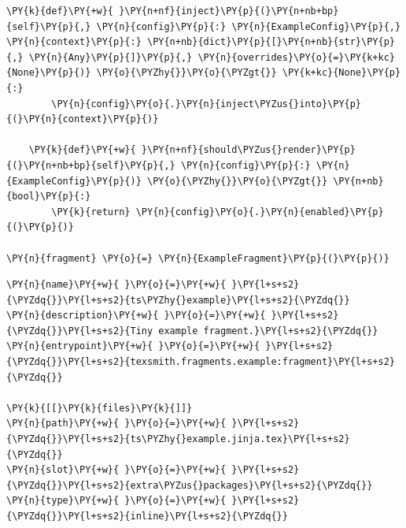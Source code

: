 \documentclass[a4paper,twoside]{article}
\begin{document}
\begin{tscode}[lang=python, engine=pygments]
\begin{Verbatim}[commandchars=\\\{\},breaklines, breakanywhere, commandchars=\\\{\}]
    \PY{k}{def}\PY{+w}{ }\PY{n+nf}{inject}\PY{p}{(}\PY{n+nb+bp}{self}\PY{p}{,} \PY{n}{config}\PY{p}{:} \PY{n}{ExampleConfig}\PY{p}{,} \PY{n}{context}\PY{p}{:} \PY{n+nb}{dict}\PY{p}{[}\PY{n+nb}{str}\PY{p}{,} \PY{n}{Any}\PY{p}{]}\PY{p}{,} \PY{n}{overrides}\PY{o}{=}\PY{k+kc}{None}\PY{p}{)} \PY{o}{\PYZhy{}}\PY{o}{\PYZgt{}} \PY{k+kc}{None}\PY{p}{:}
        \PY{n}{config}\PY{o}{.}\PY{n}{inject\PYZus{}into}\PY{p}{(}\PY{n}{context}\PY{p}{)}

    \PY{k}{def}\PY{+w}{ }\PY{n+nf}{should\PYZus{}render}\PY{p}{(}\PY{n+nb+bp}{self}\PY{p}{,} \PY{n}{config}\PY{p}{:} \PY{n}{ExampleConfig}\PY{p}{)} \PY{o}{\PYZhy{}}\PY{o}{\PYZgt{}} \PY{n+nb}{bool}\PY{p}{:}
        \PY{k}{return} \PY{n}{config}\PY{o}{.}\PY{n}{enabled}\PY{p}{(}\PY{p}{)}

\PY{n}{fragment} \PY{o}{=} \PY{n}{ExampleFragment}\PY{p}{(}\PY{p}{)}
\end{Verbatim}
\end{tscode}
\begin{tscode}[lang=toml, engine=pygments]
\begin{Verbatim}[commandchars=\\\{\},breaklines, breakanywhere, commandchars=\\\{\}]
\PY{n}{name}\PY{+w}{ }\PY{o}{=}\PY{+w}{ }\PY{l+s+s2}{\PYZdq{}}\PY{l+s+s2}{ts\PYZhy{}example}\PY{l+s+s2}{\PYZdq{}}
\PY{n}{description}\PY{+w}{ }\PY{o}{=}\PY{+w}{ }\PY{l+s+s2}{\PYZdq{}}\PY{l+s+s2}{Tiny example fragment.}\PY{l+s+s2}{\PYZdq{}}
\PY{n}{entrypoint}\PY{+w}{ }\PY{o}{=}\PY{+w}{ }\PY{l+s+s2}{\PYZdq{}}\PY{l+s+s2}{texsmith.fragments.example:fragment}\PY{l+s+s2}{\PYZdq{}}

\PY{k}{[[}\PY{k}{files}\PY{k}{]]}
\PY{n}{path}\PY{+w}{ }\PY{o}{=}\PY{+w}{ }\PY{l+s+s2}{\PYZdq{}}\PY{l+s+s2}{ts\PYZhy{}example.jinja.tex}\PY{l+s+s2}{\PYZdq{}}
\PY{n}{slot}\PY{+w}{ }\PY{o}{=}\PY{+w}{ }\PY{l+s+s2}{\PYZdq{}}\PY{l+s+s2}{extra\PYZus{}packages}\PY{l+s+s2}{\PYZdq{}}
\PY{n}{type}\PY{+w}{ }\PY{o}{=}\PY{+w}{ }\PY{l+s+s2}{\PYZdq{}}\PY{l+s+s2}{inline}\PY{l+s+s2}{\PYZdq{}}
\end{Verbatim}
\end{tscode}
\end{document}
